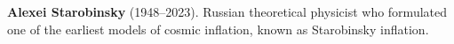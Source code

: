 \textbf{Alexei Starobinsky} (1948–2023). Russian theoretical physicist who formulated one of the earliest models of cosmic inflation, known as Starobinsky inflation.

